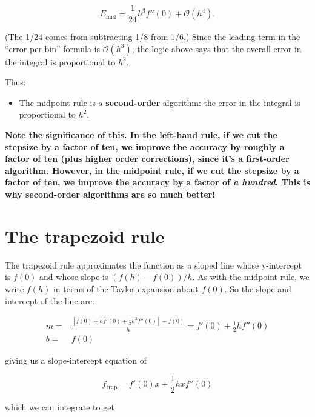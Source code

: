 \documentclass[12ampt]{article}   %
\begin{document}
\begin{equation}
  E_{\mathrm{mid}}=\frac{1}{24} h^3 f''(0) + \mathcal O(h^4).
\end{equation}

(The 1/24 comes from subtracting 1/8 from 1/6.) Since the leading term in the ``error per bin'' formula is $\mathcal O(h^3)$, the logic above says that the overall error in the integral is proportional to $h^2$.

Thus:

\begin{itemize}
      \item{The midpoint rule is a {\bf second-order} algorithm: the error in the integral is proportional to $h^2$.}
 \end{itemize}


{\bf Note the significance of this. In the left-hand rule, if we cut the stepsize by a factor of ten, we improve the accuracy by roughly a factor of ten (plus higher order corrections), since it's a first-order algorithm.
However, in the midpoint rule, if we cut the stepsize by a factor of ten, we improve the accuracy by a factor of {\it a hundred}. This is why second-order algorithms are so much better!}


\section{The trapezoid rule}

The trapezoid rule approximates the function as a sloped line whose y-intercept is $f(0)$ and whose slope is $(f(h) - f(0))/h$. As with the midpoint rule, we write $f(h)$ in terms of the Taylor expansion
about $f(0)$. So the slope and intercept of the line are:

\begin{align}
  m =& \frac{\left[ f(0) + hf'(0) + \frac{1}{2} h^2 f''(0) \right] - f(0)}{h} = f'(0) + \frac{1}{2}hf''(0) \\
  b =& f(0)
\end{align}

giving us a slope-intercept equation of

\begin{equation}
  f_{\mathrm{trap}} = f'(0)x + \frac{1}{2}hxf''(0) 
\end{equation}

which we can integrate to get 
\end{document}
